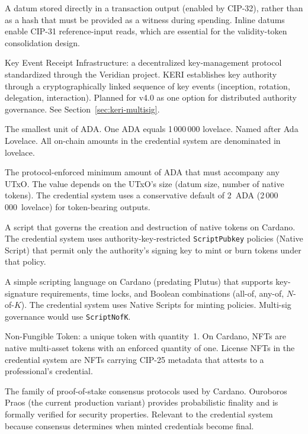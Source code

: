 \begin{description}[style=nextline, leftmargin=2.5cm, labelwidth=2.3cm]
\item[Inline Datum]
  A datum stored directly in a transaction output (enabled by CIP-32),
  rather than as a hash that must be provided as a witness during spending.
  Inline datums enable CIP-31 reference-input reads, which are essential for
  the validity-token consolidation design.

\item[KERI]
  Key Event Receipt Infrastructure: a decentralized key-management protocol
  standardized through the Veridian project.  KERI establishes key authority
  through a cryptographically linked sequence of key events (inception,
  rotation, delegation, interaction).  Planned for v4.0 as one option for
  distributed authority governance.  See Section~\ref{sec:keri-multisig}.

\item[Lovelace]
  The smallest unit of ADA.  One ADA equals 1\,000\,000 lovelace.  Named
  after Ada Lovelace.  All on-chain amounts in the credential system are
  denominated in lovelace.

\item[minUTxO]
  The protocol-enforced minimum amount of ADA that must accompany any UTxO.
  The value depends on the UTxO's size (datum size, number of native tokens).
  The credential system uses a conservative default of 2~ADA
  (2\,000\,000~lovelace) for token-bearing outputs.

\item[Minting Policy]
  A script that governs the creation and destruction of native tokens on
  Cardano.  The credential system uses authority-key-restricted
  \texttt{ScriptPubkey} policies (Native Script) that permit only the
  authority's signing key to mint or burn tokens under that policy.

\item[Native Script]
  A simple scripting language on Cardano (predating Plutus) that supports
  key-signature requirements, time locks, and Boolean combinations
  (all-of, any-of, $N$-of-$K$).  The credential system uses Native Scripts
  for minting policies.  Multi-sig governance would use
  \texttt{ScriptNofK}.

\item[NFT]
  Non-Fungible Token: a unique token with quantity~1.  On Cardano, NFTs are
  native multi-asset tokens with an enforced quantity of one.  License NFTs
  in the credential system are NFTs carrying CIP-25 metadata that attests to
  a professional's credential.

\item[Ouroboros]
  The family of proof-of-stake consensus protocols used by Cardano.
  Ouroboros Praos (the current production variant) provides probabilistic
  finality and is formally verified for security properties.  Relevant to
  the credential system because consensus determines when minted credentials
  become final.


\end{description}
